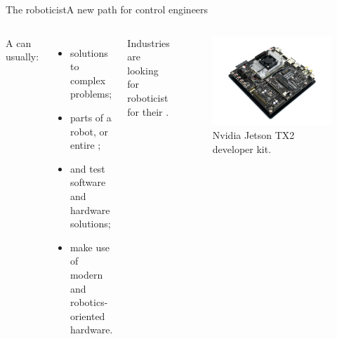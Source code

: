 \begin{frame}{The roboticist}{A new path for control engineers}
  \begin{columns}
    A  can usually:
    \begin{itemize}
      \item {} solutions to complex problems;
      \item {} parts of a robot, or entire ;
      \item {} and test software and hardware solutions;
      \item make use of modern  and robotics-oriented hardware.
    \end{itemize}
    Industries are looking for roboticist for their .

    \begin{figure}
      \centering
      \includegraphics[width=.9\textwidth]{tx2}
      \caption{Nvidia Jetson TX2 developer kit.}
      \label{fig:tx2}
    \end{figure}
  \end{columns}
\end{frame}
